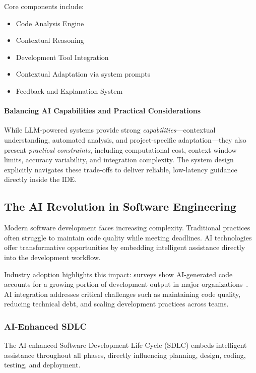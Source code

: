 \begin{spacing}{1.2}
Core components include:

\begin{itemize}
\item Code Analysis Engine
\item Contextual Reasoning
\item Development Tool Integration
\item Contextual Adaptation via system prompts
\item Feedback and Explanation System
\end{itemize}

\paragraph{Balancing AI Capabilities and Practical Considerations}
While LLM-powered systems provide strong \textit{capabilities}—contextual understanding, automated analysis, and project-specific adaptation—they also present \textit{practical constraints}, including computational cost, context window limits, accuracy variability, and integration complexity. The system design explicitly navigates these trade-offs to deliver reliable, low-latency guidance directly inside the IDE.

\subsection{The AI Revolution in Software Engineering}
Modern software development faces increasing complexity. Traditional practices often struggle to maintain code quality while meeting deadlines. AI technologies offer transformative opportunities by embedding intelligent assistance directly into the development workflow.

Industry adoption highlights this impact: surveys show AI-generated code accounts for a growing portion of development output in major organizations~\cite{google2024ai_code, google2024developer_survey}. AI integration addresses critical challenges such as maintaining code quality, reducing technical debt, and scaling development practices across teams.

\subsubsection{AI-Enhanced SDLC}
The AI-enhanced Software Development Life Cycle (SDLC) embeds intelligent assistance throughout all phases, directly influencing planning, design, coding, testing, and deployment.


\end{spacing}
